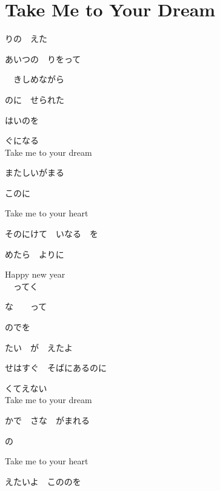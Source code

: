 \section{ Take Me to Your Dream}
\large{

りの　えた　

あいつの　りをって

　きしめながら

のに　せられた

はいのを

ぐになる
\\

Take me to your dream

またしいがまる

このに

Take me to your heart

そのにけて　いなる　を

めたら　よりに

Happy new year
\\

　ってく

な　　って

のでを

たい　が　えたよ

せはすぐ　そばにあるのに

くてえない
\\

Take me to your dream

かで　さな　がまれる

の

Take me to your heart

えたいよ　こののを

}
